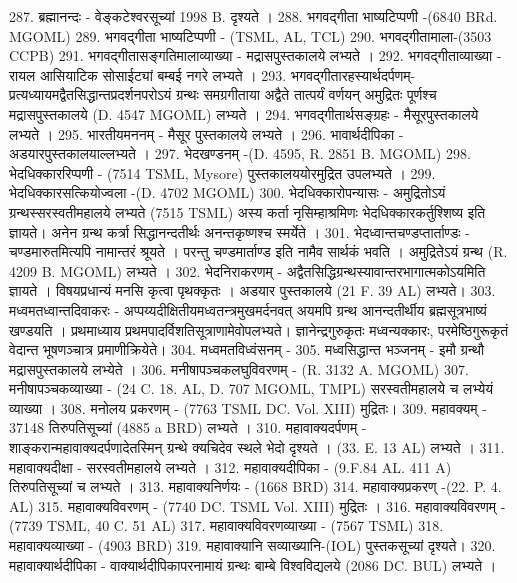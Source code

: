 287. ब्रह्मानन्दः - वेङ्कटेश्वरसूच्यां 1998 B. दृश्यते । 
288. भगवद्गीता भाष्यटिप्पणी -(6840 BRd. MGOML)
289. भगवद्गीता भाष्यटिप्पणी - (TSML, AL, TCL)
290. भगवद्गीतामाला-(3503 CCPB)
291. भगवद्गीतासङ्गतिमालाव्याख्या - मद्रासपुस्तकालये लभ्यते । 
292. भगवद्गीताव्याख्या - रायल आसियाटिक सोसाईट्यां बम्बई नगरे लभ्यते । 
293. भगवद्गीतारहस्यार्थदर्पणम्- प्रत्यध्यायमद्वैतसिद्धान्तप्रदर्शनपरोऽयं ग्रन्थः समग्रगीताया अद्वैते तात्पर्यं वर्णयन् अमुद्रितः पूर्णश्च मद्रासपुस्तकालये (D. 4547 MGOML) लभ्यते ।
294. भगवद्गीतार्थसङ्ग्रहः - मैसूरपुस्तकालये लभ्यते । 
295. भारतीयमननम् - मैसूर पुस्तकालये लभ्यते । 
296. भावार्थदीपिका - अडयारपुस्तकालयाल्लभ्यते । 
297. भेदखण्डनम् -(D. 4595, R. 2851 B. MGOML)
298. भेदधिक्काररिप्पणी - (7514 TSML, Mysore) पुस्तकालययोरमुद्रित उपलभ्यते । 
299. भेदधिक्कारसत्कियोज्वला -(D. 4702 MGOML)
300. भेदधिक्कारोपन्यासः - अमुद्रितोऽयं ग्रन्थस्सरस्वतीमहालये लभ्यते (7515 TSML) अस्य कर्ता नृसिम्हाश्रमिणः भेदधिक्कारकर्तुश्शिष्य इति ज्ञायते। अनेन ग्रन्थ कर्त्रा सिद्धानन्दतीर्थः अनन्तकृष्णश्च स्मर्येते । 
301. भेदध्वान्तचण्डप्तार्ताण्डः - चण्डमारुतमित्यपि नामान्तरं श्रूयते । परन्तु चण्डमार्ताण्ड इति नामैव सार्थकं भवति । अमुद्रितेऽयं ग्रन्थ (R. 4209 B. MGOML) लभ्यते । 
302. भेदनिराकरणम् - अद्वैतसिद्धिग्रन्थस्यावान्तरभागात्मकोऽयमिति ज्ञायते । विषयप्रधान्यं मनसि कृत्वा पृथक्कृतः । अडयार पुस्तकालये (21 F. 39 AL) लभ्यते। 
303. मध्वमतध्वान्तदिवाकरः - अप्पय्यदीक्षितीयमध्वतन्त्रमुखमर्दनवत् अयमपि ग्रन्थ आनन्दतीर्थीय ब्रह्मसूत्रभाष्यं खण्डयति । प्रथमाध्याय प्रथमपादर्विशतिसूत्राणामेवोपलभ्यते। ज्ञानेन्द्रगुरुकृतः मध्वन्यक्कारः, परमेष्ठिगुरूकृतं वेदान्त भूषणञ्चात्र प्रमाणीक्रियेते। 
304. मध्वमतविध्वंसनम् - 
305. मध्वसिद्धान्त भञ्जनम् - इमौ ग्रन्थौ मद्रासपुस्तकालये लभ्येते । 
306. मनीषापञ्चकलघुविवरणम् - (R. 3132 A. MGOML)
307. मनीषापञ्चकव्याख्या - (24 C. 18. AL, D. 707 MGOML, TMPL) सरस्वतीमहालये च लभ्येयं व्याख्या । 
308. मनोलय प्रकरणम् - (7763 TSML DC. Vol. XIII) मुद्रितः।
309. महावक्यम् - 37148 तिरुपतिसूच्यां (4885 a BRD) लभ्यते । 
310. महावाक्यदर्पणम् - शाङ्करान्महावाक्यदर्पणादेतस्मिन् ग्रन्थे क्यचिदेव स्थले भेदो दृश्यते । (33. E. 13 AL) लभ्यते । 
311. महावाक्यदीक्षा - सरस्वतीमहालये लभ्यते ।
312. महावाक्यदीपिका - (9.F.84 AL. 411 A) तिरुपतिसूच्यां च लभ्यते । 
313. महावाक्यनिर्णयः - (1668 BRD)
314. महावाक्यप्रकरण् -(22. P. 4. AL)
315. महावाक्यविवरणम् - (7740 DC. TSML Vol. XIII) मुद्रितः । 
316. महावाक्यविवरणम् - (7739 TSML, 40 C. 51 AL)
317. महावाक्यविवरणव्याख्या - (7567 TSML)
318. महावाक्यव्याख्या - (4903 BRD)
319. महावाक्यानि सव्याख्यानि-(IOL) पुस्तकसूच्यां दृश्यते। 
320. महावाक्यार्थदीपिका - वाक्यार्थदीपिकापरनामायं ग्रन्थः बाम्बे विश्वविद्यलये (2086 DC. BUL) लभ्यते । 
